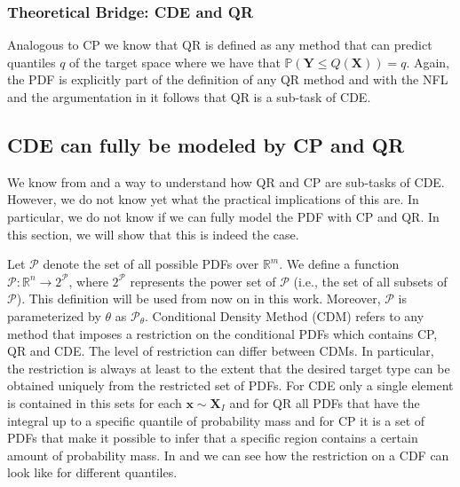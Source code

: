 \subsubsection{Theoretical Bridge: CDE and QR}\label{sec:bridge_cde_qr}

Analogous to CP we know that QR is defined as any method that can predict quantiles $q$ of the target space where we have that $\mathbb{P}(\mathbf{Y} \leq Q(\mathbf{X})) = q$. Again, the PDF is explicitly part of the definition of any QR method and with the NFL and the argumentation in  it follows that QR is a sub-task of CDE.

\subsection{CDE can fully be modeled by CP and QR} \label{sec:cde_sub_cp_qr}

We know from  and  a way to understand how QR and CP are sub-tasks of CDE. However, we do not know yet what the practical implications of this are. In particular, we do not know if we can fully model the PDF with CP and QR. In this section, we will show that this is indeed the case.

Let $\mathcal{P}$ denote the set of all possible PDFs over $\mathbb{R}^m$. We define a function $\mathscr{P}: \mathbb{R}^n \rightarrow 2^{\mathcal{P}}$, where $2^{\mathcal{P}}$ represents the power set of $\mathcal{P}$ (i.e., the set of all subsets of $\mathcal{P}$). This definition will be used from now on in this work. Moreover, $\mathscr{P}$ is parameterized by $\theta$ as $\mathscr{P}_\theta$. Conditional Density Method (CDM) refers to any method that imposes a restriction on the conditional PDFs which contains CP, QR and CDE. The level of restriction can differ between CDMs. In particular, the restriction is always at least to the extent that the desired target type can be obtained uniquely from the restricted set of PDFs. For CDE only a single element is contained in this sets for each $\mathbf{x} \sim \mathbf{X}_I$ and for QR all PDFs that have the integral up to a specific quantile of probability mass and for CP it is a set of PDFs that make it possible to infer that a specific region contains a certain amount of probability mass. In  and  we can see how the restriction on a CDF can look like for different quantiles.

